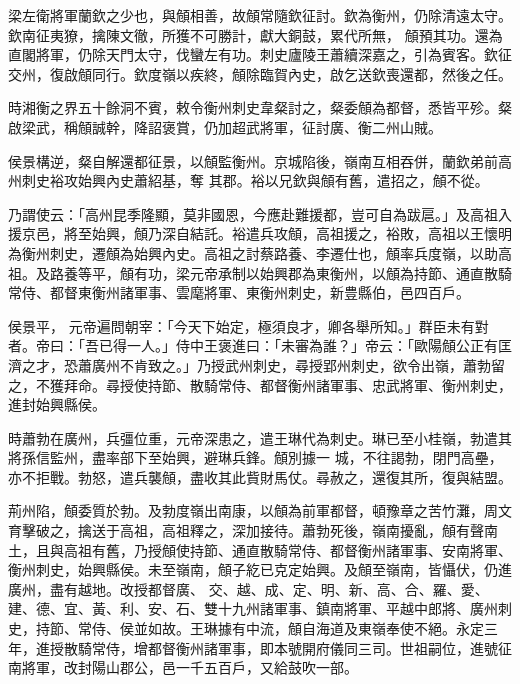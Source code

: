 \begin{pinyinscope}
 梁左衛將軍蘭欽之少也，與頠相善，故頠常隨欽征討。欽為衡州，仍除清遠太守。欽南征夷獠，擒陳文徹，所獲不可勝計，獻大銅鼓，累代所無，
 頠預其功。還為直閣將軍，仍除天門太守，伐蠻左有功。刺史廬陵王蕭續深嘉之，引為賓客。欽征交州，復啟頠同行。欽度嶺以疾終，頠除臨賀內史，啟乞送欽喪還都，然後之任。



 時湘衡之界五十餘洞不賓，敕令衡州刺史韋粲討之，粲委頠為都督，悉皆平殄。粲啟梁武，稱頠誠幹，降詔褒賞，仍加超武將軍，征討廣、衡二州山賊。



 侯景構逆，粲自解還都征景，以頠監衡州。京城陷後，嶺南互相吞併，蘭欽弟前高州刺史裕攻始興內史蕭紹基，奪
 其郡。裕以兄欽與頠有舊，遣招之，頠不從。



 乃謂使云：「高州昆季隆顯，莫非國恩，今應赴難援都，豈可自為跋扈。」及高祖入援京邑，將至始興，頠乃深自結託。裕遣兵攻頠，高祖援之，裕敗，高祖以王懷明為衡州刺史，遷頠為始興內史。高祖之討蔡路養、李遷仕也，頠率兵度嶺，以助高祖。及路養等平，頠有功，梁元帝承制以始興郡為東衡州，以頠為持節、通直散騎常侍、都督東衡州諸軍事、雲麾將軍、東衡州刺史，新豊縣伯，邑四百戶。



 侯景平，
 元帝遍問朝宰：「今天下始定，極須良才，卿各舉所知。」群臣未有對者。帝曰：「吾已得一人。」侍中王褒進曰：「未審為誰？」帝云：「歐陽頠公正有匡濟之才，恐蕭廣州不肯致之。」乃授武州刺史，尋授郢州刺史，欲令出嶺，蕭勃留之，不獲拜命。尋授使持節、散騎常侍、都督衡州諸軍事、忠武將軍、衡州刺史，進封始興縣侯。



 時蕭勃在廣州，兵彊位重，元帝深患之，遣王琳代為刺史。琳已至小桂嶺，勃遣其將孫信監州，盡率部下至始興，避琳兵鋒。頠別據一
 城，不往謁勃，閉門高壘，亦不拒戰。勃怒，遣兵襲頠，盡收其此貲財馬仗。尋赦之，還復其所，復與結盟。



 荊州陷，頠委質於勃。及勃度嶺出南康，以頠為前軍都督，頓豫章之苦竹灘，周文育擊破之，擒送于高祖，高祖釋之，深加接待。蕭勃死後，嶺南擾亂，頠有聲南土，且與高祖有舊，乃授頠使持節、通直散騎常侍、都督衡州諸軍事、安南將軍、衡州刺史，始興縣侯。未至嶺南，頠子紇已克定始興。及頠至嶺南，皆懾伏，仍進廣州，盡有越地。改授都督廣、
 交、越、成、定、明、新、高、合、羅、愛、建、德、宜、黃、利、安、石、雙十九州諸軍事、鎮南將軍、平越中郎將、廣州刺史，持節、常侍、侯並如故。王琳據有中流，頠自海道及東嶺奉使不絕。永定三年，進授散騎常侍，增都督衡州諸軍事，即本號開府儀同三司。世祖嗣位，進號征南將軍，改封陽山郡公，邑一千五百戶，又給鼓吹一部。




\end{pinyinscope}
